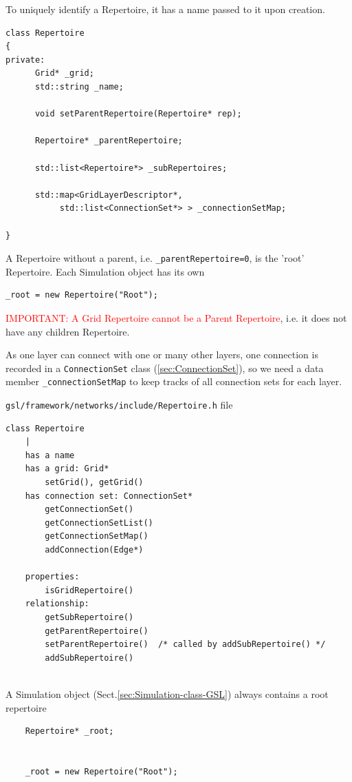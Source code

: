 To uniquely identify a Repertoire, it has a name passed to it upon
creation.

\begin{lstlisting}
class Repertoire
{
private:
      Grid* _grid;
      std::string _name;

      void setParentRepertoire(Repertoire* rep);

      Repertoire* _parentRepertoire;

      std::list<Repertoire*> _subRepertoires;

      std::map<GridLayerDescriptor*, 
	       std::list<ConnectionSet*> > _connectionSetMap;

}
\end{lstlisting}


A Repertoire without a parent, i.e. \verb!_parentRepertoire=0!, is the 'root'
Repertoire. Each Simulation object has its own 
\begin{verbatim}
_root = new Repertoire("Root");
\end{verbatim}

\textcolor{red}{IMPORTANT: A Grid Repertoire cannot be a Parent Repertoire},
i.e. it does not have any children Repertoire.


As one layer can connect with one or many other layers, one connection is
recorded in a \verb!ConnectionSet! class (\ref{sec:ConnectionSet}), so we need a
data member \verb!_connectionSetMap! to keep tracks of all connection sets for
each layer.


\verb!gsl/framework/networks/include/Repertoire.h! file
\begin{verbatim}
class Repertoire
    |
    has a name
    has a grid: Grid*
        setGrid(), getGrid()
    has connection set: ConnectionSet*
        getConnectionSet()
        getConnectionSetList()
        getConnectionSetMap()
        addConnection(Edge*)
    
    properties:
        isGridRepertoire()
    relationship:
        getSubRepertoire()   
        getParentRepertoire()
        setParentRepertoire()  /* called by addSubRepertoire() */
        addSubRepertoire()
         
\end{verbatim}


A Simulation object (Sect.\ref{sec:Simulation-class-GSL}) always contains a root repertoire
\begin{verbatim}
	Repertoire* _root;


	_root = new Repertoire("Root");
\end{verbatim}

